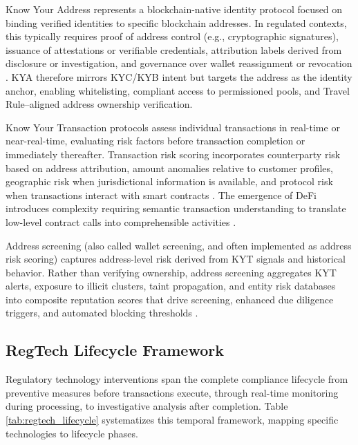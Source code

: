 Know Your Address represents a blockchain-native identity protocol focused on binding verified identities to specific blockchain addresses. In regulated contexts, this typically requires proof of address control (e.g., cryptographic signatures), issuance of attestations or verifiable credentials, attribution labels derived from disclosure or investigation, and governance over wallet reassignment or revocation \cite{reed2022decentralizedidentifiersdids,camenisch2001efficientsystemnontransferable}. KYA therefore mirrors KYC/KYB intent but targets the address as the identity anchor, enabling whitelisting, compliant access to permissioned pools, and Travel Rule–aligned address ownership verification.

Know Your Transaction protocols assess individual transactions in real-time or near-real-time, evaluating risk factors before transaction completion or immediately thereafter. Transaction risk scoring incorporates counterparty risk based on address attribution, amount anomalies relative to customer profiles, geographic risk when jurisdictional information is available, and protocol risk when transactions interact with smart contracts \cite{moser2014riskscoringbitcoin}. The emergence of DeFi introduces complexity requiring semantic transaction understanding to translate low-level contract calls into comprehensible activities \cite{chen2020understandingethereumgraph,sun2025ethereumfrauddetection}.

Address screening (also called wallet screening, and often implemented as address risk scoring) captures address-level risk derived from KYT signals and historical behavior. Rather than verifying ownership, address screening aggregates KYT alerts, exposure to illicit clusters, taint propagation, and entity risk databases into composite reputation scores that drive screening, enhanced due diligence triggers, and automated blocking thresholds \cite{moser2014riskscoringbitcoin,weber2019antimoneylaunderingbitcoin}.

\subsection{RegTech Lifecycle Framework}

Regulatory technology interventions span the complete compliance lifecycle from preventive measures before transactions execute, through real-time monitoring during processing, to investigative analysis after completion. Table \ref{tab:regtech_lifecycle} systematizes this temporal framework, mapping specific technologies to lifecycle phases.

